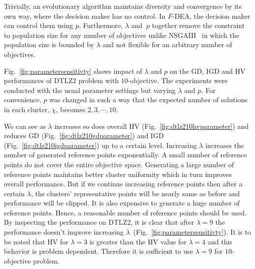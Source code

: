 \documentclass[review]{elsarticle}
\begin{document}
Trivially, an evolutionary algorithm maintains diversity and convergence by its own way, where the decision maker has no control. 
In $F$-DEA, the decision maker can control them using $p$. Furthermore, $\lambda$ and $\ p$ together remove the constraint to population size for any number of objectives unlike NSGAIII~\citep{deb2014evolutionary,thetadominance7080938} in which the population size is bounded by $\lambda$ and not flexible for an arbitrary number of objectives.

Fig.~\ref{fig:parametersensitivty} shows impact of $\lambda$ and $p$ on the GD, IGD and HV performances of DTLZ2 problem with $10$-objective. The experiments were conducted with the usual parameter settings but varying $\lambda$ and $p$. For convenience, $p$ was changed in such a way that the expected number of solutions in each cluster, $\chi$, becomes $2, 3, \cdots,10$.

We can see as $\lambda$ increases so does overall HV (Fig.~\ref{fig:dtlz210hvparameter}) and reduces GD (Fig.~\ref{fig:dtlz210gdparameter}) and IGD (Fig.~\ref{fig:dtlz210igdparameter}) up to a certain level. Increasing $\lambda$ increases the number of generated reference points exponentially. A small number of reference points do not cover the entire objective space. Generating a large number of reference points maintains better cluster uniformity which in turn improves overall performance. But if we continue increasing reference points then after a certain $\lambda$, the clusters' representative points will be nearly same as before and performance will be clipped. It is also expensive to generate a huge number of reference points. Hence, a reasonable number of  reference points should be used. By inspecting the performance on DTLZ2, it is clear that  after $\lambda=9$ the performance doesn't improve increasing $\lambda$~(Fig.~\ref{fig:parametersensitivty}). It is to be noted that HV for $\lambda=3$ is greater than the HV value for $\lambda=4$ and this behavior is problem dependent. Therefore it is sufficient to use $\lambda = 9$ for $10$-objective problem. 
\end{document}
